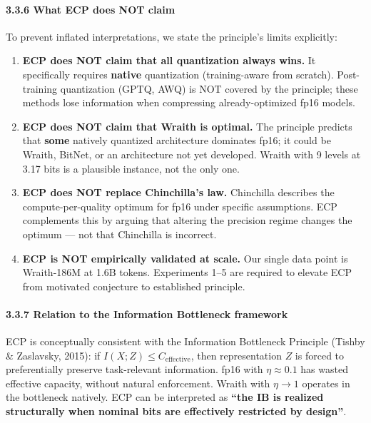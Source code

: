 \paragraph{3.3.6 What ECP does NOT claim}\label{what-ecp-does-not-claim}

To prevent inflated interpretations, we state the principle's limits
explicitly:

\begin{enumerate}
\def\labelenumi{\arabic{enumi}.}
\item
  \textbf{ECP does NOT claim that all quantization always wins.} It
  specifically requires \textbf{native} quantization (training-aware
  from scratch). Post-training quantization (GPTQ, AWQ) is NOT covered
  by the principle; these methods lose information when compressing
  already-optimized fp16 models.
\item
  \textbf{ECP does NOT claim that Wraith is optimal.} The principle
  predicts that \textbf{some} natively quantized architecture dominates
  fp16; it could be Wraith, BitNet, or an architecture not yet
  developed. Wraith with 9 levels at 3.17 bits is a plausible instance,
  not the only one.
\item
  \textbf{ECP does NOT replace Chinchilla's law.} Chinchilla describes
  the compute-per-quality optimum for fp16 under specific assumptions.
  ECP complements this by arguing that altering the precision regime
  changes the optimum --- not that Chinchilla is incorrect.
\item
  \textbf{ECP is NOT empirically validated at scale.} Our single data
  point is Wraith-186M at 1.6B tokens. Experiments 1--5 are required to
  elevate ECP from motivated conjecture to established principle.
\end{enumerate}

\paragraph{3.3.7 Relation to the Information Bottleneck
framework}\label{relation-to-the-information-bottleneck-framework}

ECP is conceptually consistent with the Information Bottleneck Principle
(Tishby \& Zaslavsky, 2015): if \(I(X; Z) \leq C_\text{effective}\),
then representation \(Z\) is forced to preferentially preserve
task-relevant information. fp16 with \(\eta \approx 0.1\) has wasted
effective capacity, without natural enforcement. Wraith with
\(\eta \to 1\) operates in the bottleneck natively. ECP can be
interpreted as \textbf{``the IB is realized structurally when nominal
bits are effectively restricted by design''}.

